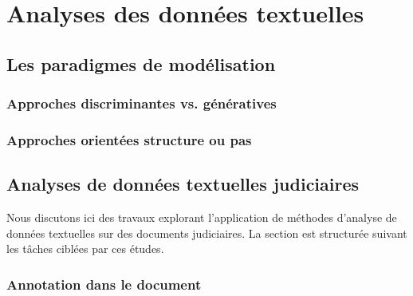 




\section{Analyses des données textuelles}
\label{sec:literature:legaltal}



\subsection{Les paradigmes de modélisation}

\subsubsection{Approches discriminantes vs. génératives}

\subsubsection{Approches orientées structure ou pas}

\subsection{Analyses de données textuelles judiciaires}

Nous discutons ici des travaux explorant l'application de méthodes d'analyse de données textuelles sur des documents judiciaires. La section est structurée suivant les tâches ciblées par ces études.

\subsubsection{Annotation dans le document}


